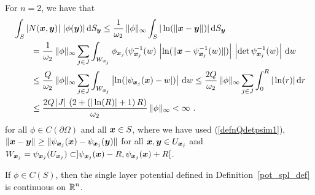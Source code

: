 \begin{enumerate}
For $n=2$, we have that
\begin{align*}
&\int_S \left| N({\bm{x}},{\bm{y}}) \right|\, |\phi({\bm{y}})| \,\mathrm{d}{S}_{{\bm{y}}}
\leq \frac{1}{\omega_2} \, \|\phi\|_\infty
\int_S |\ln(\|{\bm{x}}-{\bm{y}}\|)| \,\mathrm{d}{S}_{{\bm{y}}} \\
&\qquad = \frac{1}{\omega_2} \, \|\phi\|_\infty
\sum_{j\in J} \int_{W_{{\bm{x}}_j}}
\phi_{{\bm{x}}_j}(\psi_{{\bm{x}}_j}^{-1}(w)\,
\left|\ln(\|{\bm{x}}-\psi_{{\bm{x}}_j}^{-1}(w)\|)\right|
\,\left|\det\psi_{{\bm{x}}_j}^{-1}(w)\right|  \,\mathrm{d}{w} \\
& \qquad \leq \frac{Q}{\omega_2} \, \|\phi\|_\infty
\sum_{j\in J} \int_{W_{{\bm{x}}_j}}
\left|\ln(|\psi_{{\bm{x}}_j}({\bm{x}})-w|)\right| \,\mathrm{d}{w}
\leq \frac{2Q}{\omega_2} \, \|\phi\|_\infty
\sum_{j\in J} \int_0^R |\ln(r)| \,\mathrm{d}{r} \\
&\qquad
\leq \frac{2Q\,|J|\,
\left( 2 + \left( |\ln(R)| + 1 \right) R\right)}{\omega_2} \, \|\phi\|_\infty
< \infty \ . 
\end{align*}
for all $\phi\in C(\partial \Omega)$ and all ${\bm{x}} \in S$, where
we have used (\ref{defnQdetpsim1}), $\displaystyle \|{\bm{x}}-{\bm{y}}\| 
\geq \|\psi_{{\bm{x}}_j}({\bm{x}}) - \psi_{{\bm{x}}_j}({\bm{y}})\|$ for all
$\displaystyle {\bm{x}},{\bm{y}} \in U_{{\bm{x}}_j}$ and
$\displaystyle W_{{\bm{x}}_j} = \psi_{{\bm{x}}_j}(U_{{\bm{x}}_j}) \subset
]\psi_{{\bm{x}}_j}({\bm{x}}) -R ,  \psi_{{\bm{x}}_j}({\bm{x}}) + R[$.
\end{enumerate}

\begin{prop} \label{pot_slp_cont}
If $\phi \in C(S)$, then the single layer potential
defined in Definition~\ref{pot_spl_def} is continuous on
$\displaystyle \mathbb{R}^n$.
\end{prop}


